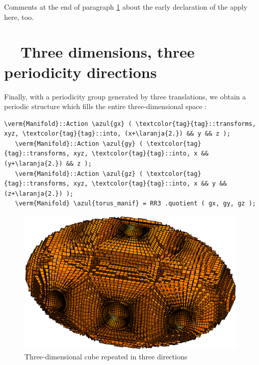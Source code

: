 Comments at the end of paragraph \ref{\numb section 7.\numb parag 13} about the early declaration of the
{\small\tt{}} {\small\tt{}} apply here, too.


\section{~~Three dimensions, three periodicity directions}\label{\numb section 7.\numb parag 13}

Finally, with a periodicity group generated by three translations, we obtain a periodic structure
which fills the entire three-dimensional space :

\begin{Verbatim}[commandchars=\\\{\},formatcom=\small\tt,frame=single,
   label=parag-\ref{\numb section 7.\numb parag 12}.cpp,rulecolor=\color{moldura},
   baselinestretch=0.94,framesep=2mm                                             ]
   \verm{Manifold}::Action \azul{gx} ( \textcolor{tag}{tag}::transforms, xyz, \textcolor{tag}{tag}::into, (x+\laranja{2.}) && y && z );
   \verm{Manifold}::Action \azul{gy} ( \textcolor{tag}{tag}::transforms, xyz, \textcolor{tag}{tag}::into, x && (y+\laranja{2.}) && z );
   \verm{Manifold}::Action \azul{gz} ( \textcolor{tag}{tag}::transforms, xyz, \textcolor{tag}{tag}::into, x && y && (z+\laranja{2.}) );
   \verm{Manifold} \azul{torus_manif} = RR3 .quotient ( gx, gy, gz );
\end{Verbatim}

\begin{figure}[ht] \centering
  \includegraphics[width=110mm]{torus-of-cubes-3d.eps}
  \caption{Three-dimensional cube repeated in three directions}
  \label{\numb section 7.\numb fig 9}
\end{figure}

